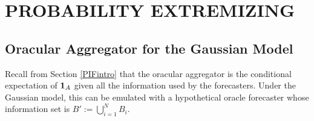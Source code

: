 \documentclass[12pt]{article}
\theoremstyle{definition}
\theoremstyle{definition}
\def\one{{\bf 1}}
\begin{document}
%

\section{PROBABILITY EXTREMIZING}
\label{extremizing}
\subsection{Oracular Aggregator for the Gaussian Model}
\label{oracular}
Recall from Section \ref{PIFintro} that the oracular aggregator is the
conditional expectation of $\one_A$ given all the information used by the
forecasters. Under the Gaussian model, this can be
emulated with a hypothetical oracle forecaster whose information set is
$B' := \bigcup_{i=1}^N B_i$.  
\end{document}
